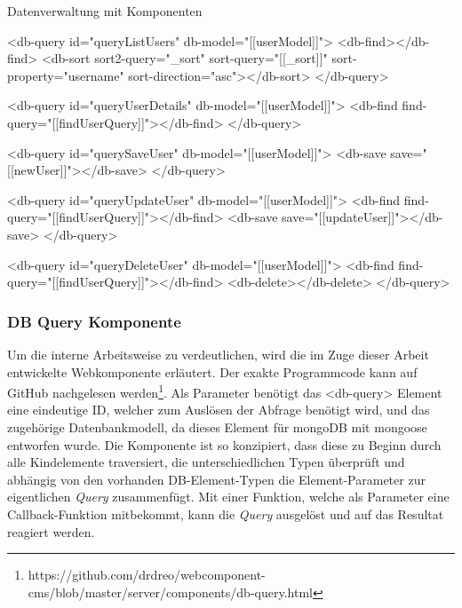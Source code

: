\begin{program}
\caption{Datenverwaltung mit Komponenten}
\label{prog:datenverwaltung}
\begin{HtmlCode}
<db-query id="queryListUsers" db-model="[[userModel]]">
		<db-find></db-find>
		<db-sort sort2-query="{{_sort}}" sort-query="[[_sort]]" sort-property="username"
		sort-direction="asc"></db-sort>
</db-query>
	
<db-query id="queryUserDetails" db-model="[[userModel]]">
		<db-find find-query="[[findUserQuery]]"></db-find>
</db-query>
	
<db-query id="querySaveUser" db-model="[[userModel]]">
		<db-save save="[[newUser]]"></db-save>
</db-query>
	
<db-query id="queryUpdateUser" db-model="[[userModel]]">
		<db-find find-query="[[findUserQuery]]"></db-find>
		<db-save save="[[updateUser]]"></db-save>
</db-query>
	
<db-query id="queryDeleteUser" db-model="[[userModel]]">
		<db-find find-query="[[findUserQuery]]"></db-find>
		<db-delete></db-delete>
</db-query>
\end{HtmlCode}
\end{program}

\subsubsection{DB Query Komponente}
Um die interne Arbeitsweise zu verdeutlichen, wird die im Zuge dieser Arbeit entwickelte Webkomponente erläutert. Der exakte Programmcode kann auf GitHub nachgelesen werden\footnote{https://github.com/drdreo/webcomponent-cms/blob/master/server/components/db-query.html}. 
Als Parameter benötigt das <db-query> Element eine eindeutige ID, welcher zum Auslösen der Abfrage benötigt wird, und das zugehörige  Datenbankmodell, da dieses Element für mongoDB mit mongoose entworfen wurde.
Die Komponente ist so konzipiert, dass diese zu Beginn durch alle Kindelemente traversiert, die unterschiedlichen Typen überprüft und abhängig von den vorhanden DB-Element-Typen die Element-Parameter zur eigentlichen \textit{Query} zusammenfügt. Mit einer Funktion, welche als Parameter eine Callback-Funktion mitbekommt, kann die  \textit{Query} ausgelöst und auf das Resultat reagiert werden.

